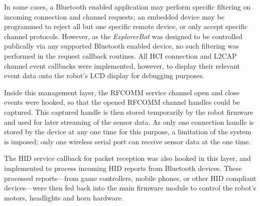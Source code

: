 

In some cases, a Bluetooth enabled application may perform specific filtering on incoming connection and channel requests; an embedded device may be programmed to reject all but one specific remote device, or only accept specific channel protocols. However, as the \textit{ExplorerBot} was designed to be controlled publically via any supported Bluetooth enabled device, no such filtering was performed in the request callback routines. All HCI connection and L2CAP channel event callbacks were implemented, however, to display their relevant event data onto the robot's LCD display for debugging purposes.

Inside this management layer, the RFCOMM service channel open and close events were hooked, so that the opened RFCOMM channel handles could be captured. This captured handle is then stored temporarily by the robot firmware and used for later streaming of the sensor data. As only one connection handle is stored by the device at any one time for this purpose, a limitation of the system is imposed; only one wireless serial port can receive sensor data at the one time.

The HID service callback for packet reception was also hooked in this layer, and implemented to process incoming HID reports from Bluetooth devices. These processed reports---from game controllers, mobile phones, or other HID compliant devices---were then fed back into the main firmware module to control the robot's motors, headlights and horn hardware.
